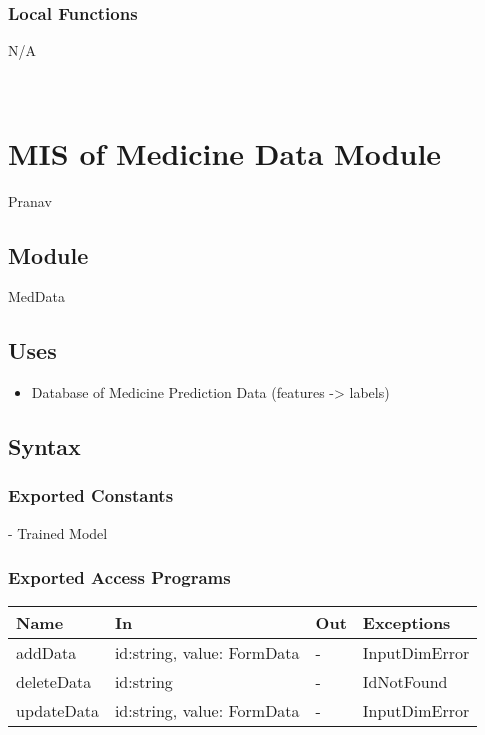 \documentclass[12pt, titlepage]{article}
\begin{document}
\subsubsection{Local Functions}

N/A

\newpage
~\newpage




\section{MIS of Medicine Data Module} \label{med_data} Pranav
\subsection{Module}

MedData

\subsection{Uses}
\begin{itemize}
  \item Database of Medicine Prediction Data (features -> labels)
\end{itemize}

\subsection{Syntax}

\subsubsection{Exported Constants}
- Trained Model

\subsubsection{Exported Access Programs}

\begin{center}
\begin{tabular}{p{2cm} p{4cm} p{4cm} p{2cm}}
\hline
\textbf{Name} & \textbf{In} & \textbf{Out} & \textbf{Exceptions} \\
\hline
addData & id:string, value: FormData & - &  InputDimError \\
deleteData & id:string & - & IdNotFound\\
updateData & id:string, value: FormData & - & InputDimError \\
\hline
\end{tabular}
\end{center}
\end{document}
